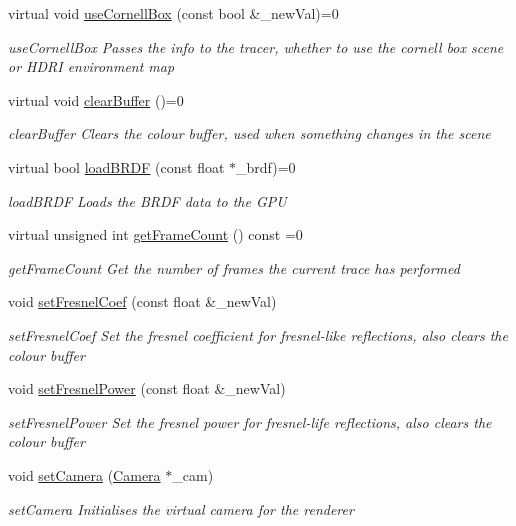\begin{DoxyCompactItemize}
virtual void \hyperlink{classvRenderer_ad5664d5c12c8869f94f9a65d4d3b2cb9}{use\-Cornell\-Box} (const bool \&\-\_\-new\-Val)=0
\begin{DoxyCompactList}\small\item\em use\-Cornell\-Box Passes the info to the tracer, whether to use the cornell box scene or H\-D\-R\-I environment map \end{DoxyCompactList}\item 
\hypertarget{classvRenderer_a14def36b2a1d0f9c8d346200d81a8e0f}{virtual void \hyperlink{classvRenderer_a14def36b2a1d0f9c8d346200d81a8e0f}{clear\-Buffer} ()=0}\label{classvRenderer_a14def36b2a1d0f9c8d346200d81a8e0f}

\begin{DoxyCompactList}\small\item\em clear\-Buffer Clears the colour buffer, used when something changes in the scene \end{DoxyCompactList}\item 
virtual bool \hyperlink{classvRenderer_a5ef0c07cbcc1d5bbdfd7fe290de700c5}{load\-B\-R\-D\-F} (const float $\ast$\-\_\-brdf)=0
\begin{DoxyCompactList}\small\item\em load\-B\-R\-D\-F Loads the B\-R\-D\-F data to the G\-P\-U \end{DoxyCompactList}\item 
virtual unsigned int \hyperlink{classvRenderer_a623eb6b3f67b6b22137783de6c788e49}{get\-Frame\-Count} () const =0
\begin{DoxyCompactList}\small\item\em get\-Frame\-Count Get the number of frames the current trace has performed \end{DoxyCompactList}\item 
void \hyperlink{classvRenderer_a34b0760641ec58f48eb1029d7f56c82c}{set\-Fresnel\-Coef} (const float \&\-\_\-new\-Val)
\begin{DoxyCompactList}\small\item\em set\-Fresnel\-Coef Set the fresnel coefficient for fresnel-\/like reflections, also clears the colour buffer \end{DoxyCompactList}\item 
void \hyperlink{classvRenderer_a17188eb1567d612d3f27d290e3fd237b}{set\-Fresnel\-Power} (const float \&\-\_\-new\-Val)
\begin{DoxyCompactList}\small\item\em set\-Fresnel\-Power Set the fresnel power for fresnel-\/life reflections, also clears the colour buffer \end{DoxyCompactList}\item 
void \hyperlink{classvRenderer_a329c3c3b1977f7cb6fd465bcd0e13c9f}{set\-Camera} (\hyperlink{classCamera}{Camera} $\ast$\-\_\-cam)
\begin{DoxyCompactList}\small\item\em set\-Camera Initialises the virtual camera for the renderer \end{DoxyCompactList}\end{DoxyCompactItemize}
